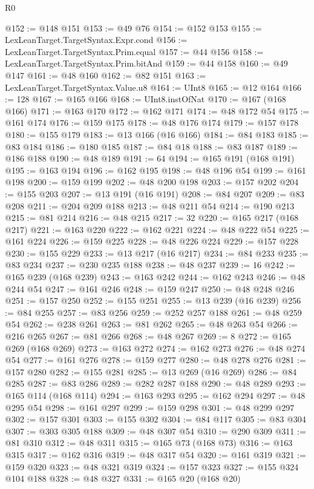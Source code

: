 \begin{lexlean}{R0}
\begin{coremodule}
@152 := @148 @151
@153 := @49 @76
@154 := @152 @153
@155 := LexLeanTarget.TargetSyntax.Expr.cond
@156 := LexLeanTarget.TargetSyntax.Prim.equal
@157 := @44 @156
@158 := LexLeanTarget.TargetSyntax.Prim.bitAnd
@159 := @44 @158
@160 := @49 @147
@161 := @48 @160
@162 := @82 @151
@163 := LexLeanTarget.TargetSyntax.Value.u8
@164 := UInt8
@165 := @12 @164
@166 := 128
@167 := @165 @166
@168 := UInt8.instOfNat
@170 := @167 (@168 @166)
@171 := @163 @170
@172 := @162 @171
@174 := @48 @172 @54
@175 := @161 @174
@176 := @159 @175
@178 := @48 @176 @174
@179 := @157 @178
@180 := @155 @179
@183 := @13 @166 (@16 @166)
@184 := @84 @183
@185 := @83 @184
@186 := @180 @185
@187 := @84 @18
@188 := @83 @187
@189 := @186 @188
@190 := @48 @189
@191 := 64
@194 := @165 @191 (@168 @191)
@195 := @163 @194
@196 := @162 @195
@198 := @48 @196 @54
@199 := @161 @198
@200 := @159 @199
@202 := @48 @200 @198
@203 := @157 @202
@204 := @155 @203
@207 := @13 @191 (@16 @191)
@208 := @84 @207
@209 := @83 @208
@211 := @204 @209 @188
@213 := @48 @211 @54
@214 := @190 @213
@215 := @81 @214
@216 := @48 @215
@217 := 32
@220 := @165 @217 (@168 @217)
@221 := @163 @220
@222 := @162 @221
@224 := @48 @222 @54
@225 := @161 @224
@226 := @159 @225
@228 := @48 @226 @224
@229 := @157 @228
@230 := @155 @229
@233 := @13 @217 (@16 @217)
@234 := @84 @233
@235 := @83 @234
@237 := @230 @235 @188
@238 := @48 @237
@239 := 16
@242 := @165 @239 (@168 @239)
@243 := @163 @242
@244 := @162 @243
@246 := @48 @244 @54
@247 := @161 @246
@248 := @159 @247
@250 := @48 @248 @246
@251 := @157 @250
@252 := @155 @251
@255 := @13 @239 (@16 @239)
@256 := @84 @255
@257 := @83 @256
@259 := @252 @257 @188
@261 := @48 @259 @54
@262 := @238 @261
@263 := @81 @262
@265 := @48 @263 @54
@266 := @216 @265
@267 := @81 @266
@268 := @48 @267
@269 := 8
@272 := @165 @269 (@168 @269)
@273 := @163 @272
@274 := @162 @273
@276 := @48 @274 @54
@277 := @161 @276
@278 := @159 @277
@280 := @48 @278 @276
@281 := @157 @280
@282 := @155 @281
@285 := @13 @269 (@16 @269)
@286 := @84 @285
@287 := @83 @286
@289 := @282 @287 @188
@290 := @48 @289
@293 := @165 @114 (@168 @114)
@294 := @163 @293
@295 := @162 @294
@297 := @48 @295 @54
@298 := @161 @297
@299 := @159 @298
@301 := @48 @299 @297
@302 := @157 @301
@303 := @155 @302
@304 := @84 @117
@305 := @83 @304
@307 := @303 @305 @188
@309 := @48 @307 @54
@310 := @290 @309
@311 := @81 @310
@312 := @48 @311
@315 := @165 @73 (@168 @73)
@316 := @163 @315
@317 := @162 @316
@319 := @48 @317 @54
@320 := @161 @319
@321 := @159 @320
@323 := @48 @321 @319
@324 := @157 @323
@327 := @155 @324 @104 @188
@328 := @48 @327
@331 := @165 @20 (@168 @20)

\end{coremodule}
\end{lexlean}
